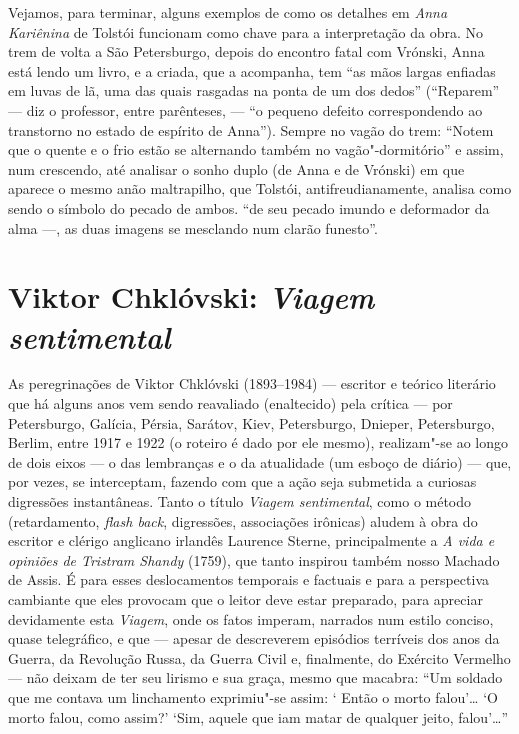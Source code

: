 Vejamos, para terminar, alguns exemplos de como os detalhes em
\emph{Anna Kariênina} de Tolstói funcionam como chave para a
interpretação da obra. No trem de volta a São Petersburgo, depois do
encontro fatal com Vrónski, Anna está lendo um livro, e a criada, que a
acompanha, tem ``as mãos largas enfiadas em luvas de lã, uma das quais
rasgadas na ponta de um dos dedos'' (``Reparem'' --- diz o
professor, entre parênteses, --- ``o pequeno defeito
correspondendo ao transtorno no estado de espírito de Anna'').
Sempre no vagão do trem: ``Notem que o quente e o frio estão se
alternando também no vagão"-dormitório'' e assim, num crescendo, até
analisar o sonho duplo (de Anna e de Vrónski) em que aparece o mesmo
anão maltrapilho, que Tolstói, antifreudianamente, analisa como sendo o
símbolo do pecado de ambos. ``de seu pecado imundo e deformador da alma
---, as duas imagens se mesclando num clarão funesto''.

\chapter{Viktor Chklóvski: \emph{Viagem sentimental}}

As peregrinações de Viktor Chklóvski (1893--1984) --- escritor e teórico
literário que há alguns anos vem sendo reavaliado (enaltecido) pela
crítica --- por Petersburgo, Galícia, Pérsia, Sarátov, Kiev,
Petersburgo, Dnieper, Petersburgo, Berlim, entre 1917 e 1922 (o roteiro
é dado por ele mesmo), realizam"-se ao longo de dois eixos --- o das
lembranças e o da atualidade (um esboço de diário) --- que, por vezes,
se interceptam, fazendo com que a ação seja submetida a curiosas
digressões instantâneas. Tanto o título \emph{Viagem sentimental}, como
o método (retardamento, \emph{flash back}, digressões, associações
irônicas) aludem à obra do escritor e clérigo anglicano irlandês
Laurence Sterne, principalmente a \emph{A vida e opiniões de Tristram
Shandy} (1759), que tanto inspirou também nosso Machado de Assis. É para
esses deslocamentos temporais e factuais e para a perspectiva cambiante
que eles provocam que o leitor deve estar preparado, para apreciar
devidamente esta \emph{Viagem}, onde os fatos imperam, narrados num
estilo conciso, quase telegráfico, e que --- apesar de descreverem
episódios terríveis dos anos da  Guerra, da Revolução Russa, da Guerra
Civil e, finalmente, do Exército Vermelho --- não deixam de ter seu
lirismo e sua graça, mesmo que macabra: ``Um soldado que me contava um
linchamento exprimiu"-se assim: ` Então o morto falou'\ldots{} `O morto falou,
como assim?' `Sim, aquele que iam matar de qualquer jeito, falou'\ldots{}''

